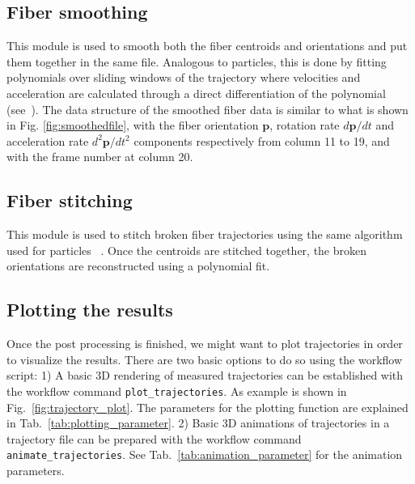\documentclass[10pt,a4paper]{article}
\begin{document}
\subsection{Fiber smoothing} \label{sec:fibers_smoothing}

This module is used to smooth both the fiber centroids and orientations and put them together in the same file. Analogous to particles, this is done by fitting polynomials over sliding windows of the trajectory where velocities and acceleration are calculated through a direct differentiation of the polynomial (see~\cite{Luthi2005}). The data structure of the smoothed fiber data is similar to what is shown in Fig. \ref{fig:smoothedfile}, with the fiber orientation $\textbf{p}$, rotation rate $d \textbf{p}/dt$ and acceleration rate $d^2 \textbf{p}/dt^2$ components respectively from column 11 to 19, and with the frame number at column 20.

\subsection{Fiber stitching} \label{sec:fibers_stitching}

This module is used to stitch broken fiber trajectories using the same algorithm used for particles ~\cite{Xu2008}. Once the centroids are stitched together, the broken orientations are reconstructed using a polynomial fit.



\subsection{Plotting the results} \label{sec:plot_trajectories}

Once the post processing is finished, we might want to plot trajectories in order to visualize the results. There are two basic options to do so using the workflow script: 1) A basic 3D rendering of measured trajectories can be established with the workflow command \texttt{plot\_trajectories}. As example is shown in Fig.~\ref{fig:trajectory_plot}. The parameters for the plotting function are explained in Tab.~\ref{tab:plotting_parameter}. 2) Basic 3D animations of trajectories in a trajectory file can be prepared with the workflow command \texttt{animate\_trajectories}. See Tab.~\ref{tab:animation_parameter} for the animation parameters.
\end{document}

